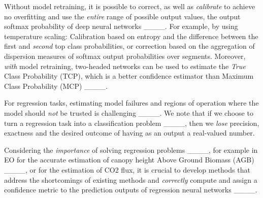 Without model retraining, it is possible to correct, as well as \textit{calibrate} to achieve no overfitting and use the \textit{entire} range of possible output values, the output softmax probability of deep neural networks ____. %
For example, by using temperature scaling: Calibration based on entropy and the difference between the first and \textit{second} top class probabilities, or correction based on the aggregation of dispersion measures of softmax output probabilities over segments. 
Moreover, \textit{with} model retraining, two-headed networks can be used to estimate the \textit{True} Class Probability (TCP), which is a better confidence estimator than Maximum Class Probability (MCP) ____.

For regression tasks, estimating model failures and regions of operation where the model should \textit{not} be trusted is challenging ____.       
We note that if we choose to turn a regression task into a classification problem ____, then we \textit{lose} precision, exactness and the desired outcome of having as an output a real-valued number. %




















Considering the \textit{importance} of solving regression problems ____, for example in EO for the accurate estimation of canopy height Above Ground Biomass (AGB) ____, or for the estimation of CO2 flux, it is crucial to develop methods that address the shortcomings of existing methods and \textit{correctly} compute and assign a confidence metric to the prediction outputs of regression neural networks ____.



